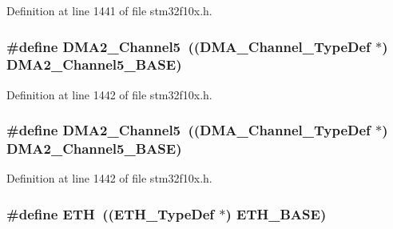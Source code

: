 Definition at line 1441 of file stm32f10x.\+h.

\subsubsection[{\texorpdfstring{D\+M\+A2\+\_\+\+Channel5}{DMA2_Channel5}}]{\setlength{\rightskip}{0pt plus 5cm}\#define D\+M\+A2\+\_\+\+Channel5~(({\bf D\+M\+A\+\_\+\+Channel\+\_\+\+Type\+Def} $\ast$) {\bf D\+M\+A2\+\_\+\+Channel5\+\_\+\+B\+A\+SE})}\hypertarget{group___peripheral__declaration_ga521c13b7d0f82a6897d47995da392750}{}\label{group___peripheral__declaration_ga521c13b7d0f82a6897d47995da392750}


Definition at line 1442 of file stm32f10x.\+h.

\subsubsection[{\texorpdfstring{D\+M\+A2\+\_\+\+Channel5}{DMA2_Channel5}}]{\setlength{\rightskip}{0pt plus 5cm}\#define D\+M\+A2\+\_\+\+Channel5~(({\bf D\+M\+A\+\_\+\+Channel\+\_\+\+Type\+Def} $\ast$) {\bf D\+M\+A2\+\_\+\+Channel5\+\_\+\+B\+A\+SE})}\hypertarget{group___peripheral__declaration_ga521c13b7d0f82a6897d47995da392750}{}\label{group___peripheral__declaration_ga521c13b7d0f82a6897d47995da392750}


Definition at line 1442 of file stm32f10x.\+h.

\subsubsection[{\texorpdfstring{E\+TH}{ETH}}]{\setlength{\rightskip}{0pt plus 5cm}\#define E\+TH~(({\bf E\+T\+H\+\_\+\+Type\+Def} $\ast$) {\bf E\+T\+H\+\_\+\+B\+A\+SE})}\hypertarget{group___peripheral__declaration_ga3a3f60de4318afbd0b3318e7a416aadc}{}\label{group___peripheral__declaration_ga3a3f60de4318afbd0b3318e7a416aadc}


